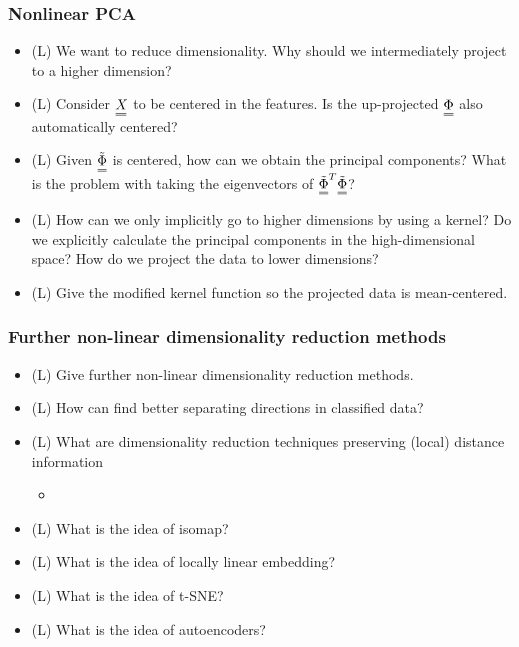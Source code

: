 \subsubsection*{Nonlinear PCA}
\begin{itemize}
    \item (L) We want to reduce dimensionality. Why should we intermediately project to a higher dimension?
    \answerboxM
    \item (L) Consider $\mat{X}$ to be centered in the features. Is the up-projected $\mat{\Phi}$ also automatically centered?
    \answerboxS
    \item (L) Given $\mat{\tilde{\Phi}}$ is centered, how can we obtain the principal components? What is the problem with
    taking the eigenvectors of $\mat{\tilde{\Phi}}^T \mat{\tilde{\Phi}}$?
    \answerboxM
    \item (L) How can we only implicitly go to higher dimensions by using a kernel? Do we explicitly calculate
    the principal components in the high-dimensional space? How do we project the data to lower dimensions?
    \answerboxL
    \item (L) Give the modified kernel function so the projected data is mean-centered.
    \answerboxL
\end{itemize}

\subsubsection*{Further non-linear dimensionality reduction methods}
\begin{itemize}
    \item (L) Give further non-linear dimensionality reduction methods.
    \answerboxL
    \item (L) How can find better separating directions in classified data?
    \answerboxM
    \item (L) What are dimensionality reduction techniques preserving (local) distance information
    \begin{itemize}
        \item {}
    \end{itemize}
    \answerboxM
    \item (L) What is the idea of isomap?
    \answerboxM
    \item (L) What is the idea of locally linear embedding?
    \answerboxM
    \item (L) What is the idea of t-SNE?
    \answerboxM
    \item (L) What is the idea of autoencoders?
    \answerboxM
\end{itemize}

